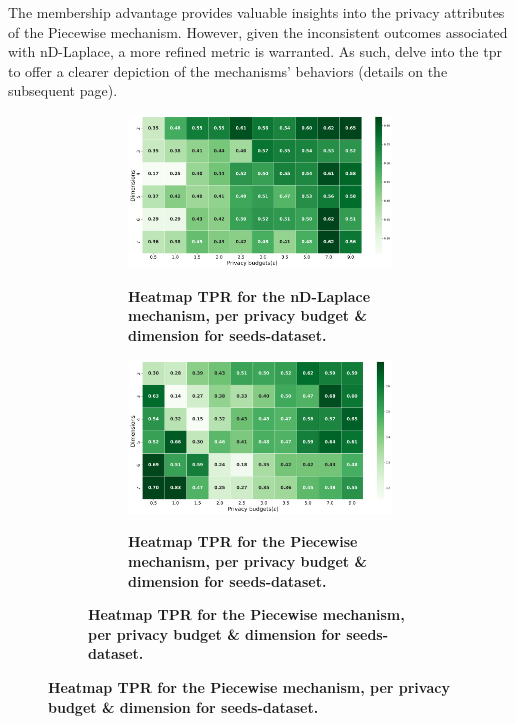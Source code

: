 The membership advantage provides valuable insights into the privacy attributes of the Piecewise mechanism. However, given the inconsistent outcomes associated with nD-Laplace, a more refined metric is warranted. As such,  delve into the \gls{tpr} to offer a clearer depiction of the mechanisms' behaviors (details on the subsequent page).\newpage
\begin{figure}[H]
  \centering
  \begin{subfigure}[b]{0.75\textwidth}
    \begin{subfigure}[c]{1\textwidth}
      \caption{\textbf{Heatmap TPR for the nD-Laplace mechanism, per privacy budget \& dimension for seeds-dataset.}}
      \includegraphics[width=1\textwidth]{Results/nd-laplace/nd-Laplace/seeds-dataset/tpr.png}
      \label{fig:privacy_tpr_seeds-dataset_adversial_advantage_kd-laplace}
    \end{subfigure}
    \vfill %
    \begin{subfigure}[c]{1\textwidth}
      \caption{\textbf{Heatmap TPR for the Piecewise mechanism, per privacy budget \& dimension for seeds-dataset.}}
      \includegraphics[width=1\textwidth]{Results/nd-laplace/piecewise/seeds-dataset/tpr.png}
      \label{fig:privacy_tpr_seeds-dataset_adversial_advantage_piecewise}
    \end{subfigure}
  \end{subfigure}
\end{figure}
